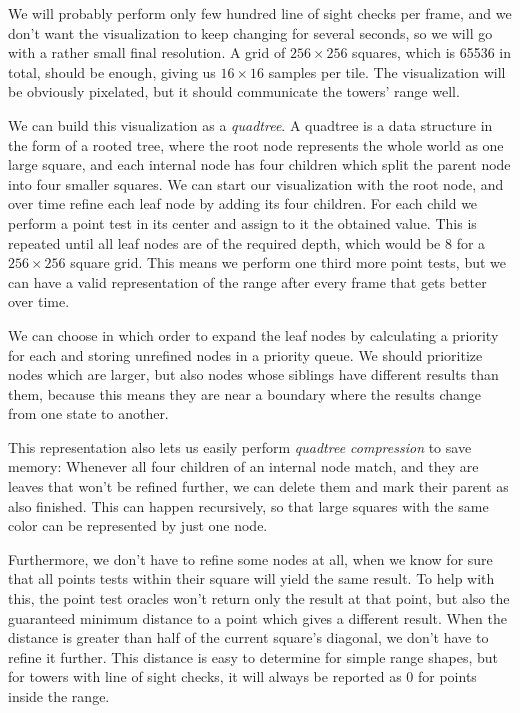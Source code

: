 We will probably perform only few hundred line of sight checks per frame, and we don't want the visualization to keep changing for several seconds, so we will go with a rather small final resolution.
A grid of $256 \times 256$ squares, which is 65536 in total, should be enough, giving us $16 \times 16$ samples per tile.
The visualization will be obviously pixelated, but it should communicate the towers' range well.

We can build this visualization as a \emph{quadtree}.
A quadtree is a data structure in the form of a rooted tree, where the root node represents the whole world as one large square, and each internal node has four children which split the parent node into four smaller squares.
We can start our visualization with the root node, and over time refine each leaf node by adding its four children.
For each child we perform a point test in its center and assign to it the obtained value.
This is repeated until all leaf nodes are of the required depth, which would be 8 for a $256 \times 256$ square grid.
This means we perform one third more point tests, but we can have a valid representation of the range after every frame that gets better over time.

We can choose in which order to expand the leaf nodes by calculating a priority for each and storing unrefined nodes in a priority queue.
We should prioritize nodes which are larger, but also nodes whose siblings have different results than them, because this means they are near a boundary where the results change from one state to another.

This representation also lets us easily perform \emph{quadtree compression} to save memory:
Whenever all four children of an internal node match, and they are leaves that won't be refined further, we can delete them and mark their parent as also finished.
This can happen recursively, so that large squares with the same color can be represented by just one node.

Furthermore, we don't have to refine some nodes at all, when we know for sure that all points tests within their square will yield the same result.
To help with this, the point test oracles won't return only the result at that point, but also the guaranteed minimum distance to a point which gives a different result.
When the distance is greater than half of the current square's diagonal, we don't have to refine it further.
This distance is easy to determine for simple range shapes, but for towers with line of sight checks, it will always be reported as 0 for points inside the range.

